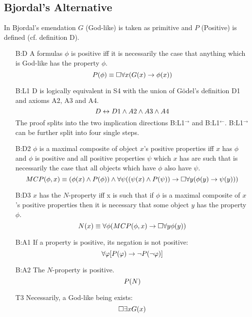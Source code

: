 \documentclass{birkjour}
\theoremstyle{definition}
\theoremstyle{remark}
\numberwithin{equation}{section}
\begin{document}
\begin{appendix}

\section{Bjordal's Alternative} \label{apx:Bjordal}

In Bjordal's emendation $G$ (God-like) is taken as primitive and $P$ (Positive) is defined (cf. definition D).
\begin{itemize}
\item[B:D] A formulas $\phi$ is positive iff it is necessarily the case
  that anything which is God-like has the property $\phi$.
  $$P(\phi) \equiv \Box \forall x (G(x) \rightarrow \phi(x))$$ 
\item[B:L1] D is logically equivalent in S4 with the union of G\"odel's definition D1 and axioms A2, A3 and A4.
  $$D \leftrightarrow D1 \wedge A2 \wedge A3 \wedge A4$$
  The proof splits into the two implication directions B:L1$^\rightarrow$ and B:L1$^\leftarrow$. B:L1$^\rightarrow$ can be further split into four single steps.
\item[B:D2] $\phi$ is a maximal composite of object $x$'s positive properties iff $x$ has $\phi$ and $\phi$ is positive and all positive properties $\psi$ which $x$ has are such that is necessarily the case that all objects which have $\phi$ also have $\psi$.
  $$MCP(\phi,x) \equiv (\phi(x) \wedge P(\phi)) \wedge \forall \psi ((\psi(x) \wedge P(\psi)) \rightarrow \Box \forall y (\phi(y) \rightarrow \psi(y)))$$
\item[B:D3] $x$ has the $N$-property iff x is such that if $\phi$ is a maximal composite of $x$'s positive properties then it is necessary that some object $y$ has the property $\phi$.
  $$N(x) \equiv \forall \phi (MCP(\phi,x) \rightarrow \Box \forall y \phi(y))$$
\item[B:A1] If a property is positive, its negation is not positive:
  $$\forall \varphi [P(\varphi) \rightarrow \neg P(\neg \varphi)]$$ 
\item[B:A2] The $N$-property is positive.
 $$P(N)$$
\item[T3] Necessarily, a God-like being exists: $$\Box \exists x G(x)$$ 
\end{itemize}

\end{appendix}


\end{document}

